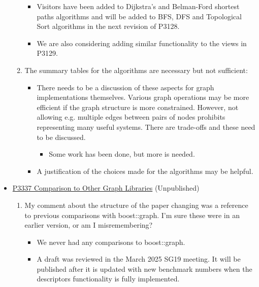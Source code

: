 \begin{itemize}
\begin{enumerate}
\begin{itemize}
                              \item Visitors have been added to Dijkstra's and Belman-Ford shortest paths algorithms and will be added 
                                    to BFS, DFS and Topological Sort algorithms in the next revision of P3128.
                              \item We are also considering adding similar functionality to the views in P3129.
                        \end{itemize}
                  \item The summary tables for the algorithms are necessary but not sufficient: 
                        \begin{itemize}
                              \item There needs to be a discussion of these aspects for graph implementations themselves. Various graph operations may 
                                    be more efficient if the graph structure is more constrained. However, not allowing e.g. multiple edges between pairs 
                                    of nodes prohibits representing many useful systems. There are trade-offs and these need to be discussed.
                                    \begin{itemize}
                                          \item Some work has been done, but more is needed.
                                    \end{itemize}
                              \item A justification of the choices made for the algorithms may be helpful.
                  \end{itemize}
            \end{enumerate}
      \item \href{https://www.wg21.link/P3337}{P3337 Comparison to Other Graph Libraries} (Unpublished)
            \begin{enumerate}
                  \item My comment about the structure of the paper changing was a reference to previous comparisons with boost::graph. 
                        I'm sure these were in an earlier version, or am I misremembering?
                  \begin{itemize}
                        \item We never had any comparisons to boost::graph. 
                        \item A draft was reviewed in the March 2025 SG19 meeting. It will be published after it is updated with new
                              benchmark numbers when the descriptors functionality is fully implemented.
                  \end{itemize}
            \end{enumerate}
\end{itemize}

